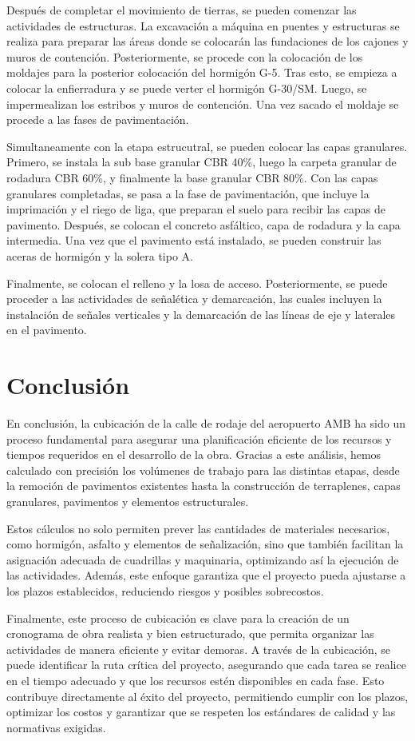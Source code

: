 \documentclass{article} %
\begin{document}
Después de completar el movimiento de tierras, se pueden comenzar las actividades de estructuras. La excavación a máquina en puentes y estructuras se realiza para preparar las áreas donde se colocarán las fundaciones de los cajones y muros de contención. Posteriormente, se procede con la colocación de los moldajes para la posterior colocación del hormigón G-5. Tras esto, se empieza a colocar la enfierradura y se puede verter el hormigón G-30/SM. Luego, se impermealizan los estribos y muros de contención. Una vez sacado el moldaje se procede a las fases de pavimentación.

Simultaneamente con la etapa estrucutral, se pueden colocar las capas granulares. Primero, se instala la sub base granular CBR 40\%, luego la carpeta granular de rodadura CBR 60\%, y finalmente la base granular CBR 80\%. Con las capas granulares completadas, se pasa a la fase de pavimentación, que incluye la imprimación y el riego de liga, que preparan el suelo para recibir las capas de pavimento. Después, se colocan el concreto asfáltico, capa de rodadura y la capa intermedia. Una vez que el pavimento está instalado, se pueden construir las aceras de hormigón y la solera tipo A.

Finalmente, se colocan el relleno y la losa de acceso. Posteriormente, se puede proceder a las actividades de señalética y demarcación, las cuales incluyen la instalación de señales verticales y la demarcación de las líneas de eje y laterales en el pavimento.

\newpage
\section{Conclusión}

En conclusión, la cubicación de la calle de rodaje del aeropuerto AMB ha sido un proceso fundamental para asegurar una planificación eficiente de los recursos y tiempos requeridos en el desarrollo de la obra. Gracias a este análisis, hemos calculado con precisión los volúmenes de trabajo para las distintas etapas, desde la remoción de pavimentos existentes hasta la construcción de terraplenes, capas granulares, pavimentos y elementos estructurales.

Estos cálculos no solo permiten prever las cantidades de materiales necesarios, como hormigón, asfalto y elementos de señalización, sino que también facilitan la asignación adecuada de cuadrillas y maquinaria, optimizando así la ejecución de las actividades. Además, este enfoque garantiza que el proyecto pueda ajustarse a los plazos establecidos, reduciendo riesgos y posibles sobrecostos.

Finalmente, este proceso de cubicación es clave para la creación de un cronograma de obra realista y bien estructurado, que permita organizar las actividades de manera eficiente y evitar demoras. A través de la cubicación, se puede identificar la ruta crítica del proyecto, asegurando que cada tarea se realice en el tiempo adecuado y que los recursos estén disponibles en cada fase. Esto contribuye directamente al éxito del proyecto, permitiendo cumplir con los plazos, optimizar los costos y garantizar que se respeten los estándares de calidad y las normativas exigidas.
\end{document}
